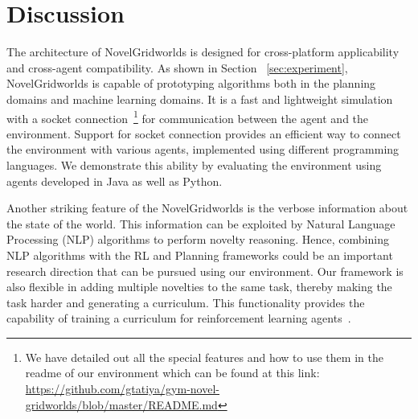 \documentclass[sigconf]{aamas}
\begin{document}
\section{Discussion}
\label{sec:discussion}

The architecture of NovelGridworlds is designed for cross-platform applicability and cross-agent compatibility. As shown in Section ~\ref{sec:experiment}, NovelGridworlds is capable of prototyping algorithms both in the planning domains and machine learning domains. It is a fast and lightweight simulation with a socket connection~\footnote{We have detailed out all the special features and how to use them in the readme of our environment which can be found at this link: \url{https://github.com/gtatiya/gym-novel-gridworlds/blob/master/README.md}} for communication between the agent and the environment. Support for socket connection provides an efficient way to connect the environment with various agents, implemented using different programming languages.
We demonstrate this ability by evaluating the environment using agents developed in Java as well as Python.

Another striking feature of the NovelGridworlds is the verbose information about the state of the world. This information can be exploited by Natural Language Processing (NLP) algorithms to perform novelty reasoning. Hence, combining NLP algorithms with the RL and Planning frameworks could be an important research direction that can be pursued using our environment. Our framework is also flexible in adding multiple novelties to the same task, thereby making the task harder and generating a curriculum. This functionality provides the capability of training a curriculum for reinforcement learning agents~\citep{narvekar2020curriculum}.
\end{document}
